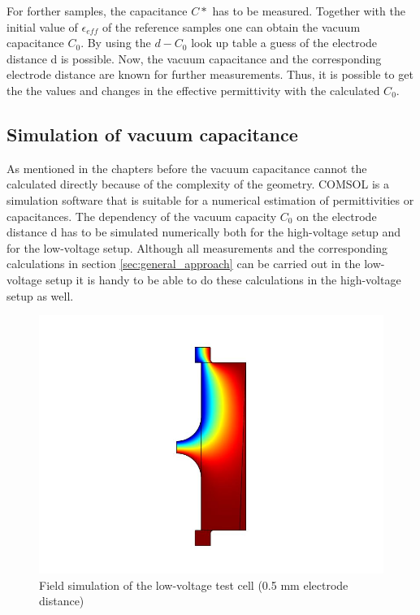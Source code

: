 For forther samples, the capacitance $C*$ has to be measured. Together with the initial value of $\epsilon_{eff}$ of the reference samples one can obtain the vacuum capacitance $C_0$. By using the $d-C_0$ look up table a guess of the electrode distance d is possible. Now, the vacuum capacitance and the corresponding electrode distance are known for further measurements. Thus, it is possible to get the the values and changes in the effective permittivity with the calculated $C_0$.

\subsection{Simulation of vacuum capacitance} 
As mentioned in the chapters before the vacuum capacitance cannot the calculated directly because of the complexity of the geometry. COMSOL is a simulation software that is suitable for a numerical estimation of permittivities or capacitances. The dependency of the vacuum capacity $C_0$ on the electrode distance d has to be simulated numerically both for the high-voltage setup and for the low-voltage setup. Although all measurements and the corresponding calculations in section \ref{sec:general_approach} can be carried out in the low-voltage setup it is handy to be able to do these calculations in the high-voltage setup as well. 


\begin{figure}[htbp]
	\centering
	\includegraphics{figures/COMSOL_Beispielbild.jpg}		
	\caption[Kurze Abbildungsbeschreibung]{Field simulation of the low-voltage test cell (0.5 mm electrode distance)} \label{fig.comsol_beispiel}

\end{figure}
 
